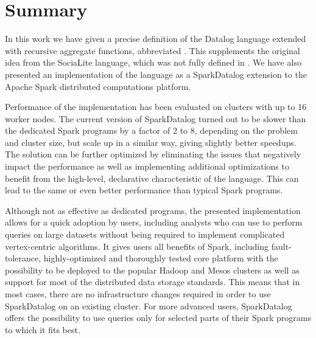 

\chapter{Summary}\label{r:summary}

In this work we have given a precise definition of the Datalog language extended with recursive aggregate functions, abbreviated \datalogra. This supplements the original idea from the SociaLite language, which was not fully defined in \cite{socialite, distsoc}. We have also presented an implementation of the \datalogra language as a SparkDatalog extension to the Apache Spark distributed computations platform.

Performance of the implementation has been evaluated on clusters with up to 16 worker nodes. The current version of SparkDatalog turned out to be slower than the dedicated Spark programs by a factor of 2 to 8, depending on the problem and cluster size, but scale up in a similar way, giving slightly better speedups. The solution can be further optimized by eliminating the issues that negatively impact the performance as well as implementing additional optimizations to benefit from the high-level, declarative characteristic of the language. This can lead to the same or even better performance than typical Spark programs.

Although not as effective as dedicated programs, the presented implementation allows for a quick adoption by users, including analysts who can use \datalogra to perform queries on large datasets without being required to implement complicated vertex-centric algorithms. It gives users all benefits of Spark, including fault-tolerance, highly-optimized and thoroughly tested core platform with the possibility to be deployed to the popular Hadoop and Mesos clusters as well as support for most of the distributed data storage standards. This means that in most cases, there are no infrastructure changes required in order to use SparkDatalog on an existing cluster. For more advanced users, SparkDatalog offers the possibility to use \datalogra queries only for selected parts of their Spark programs to which it fits best.


